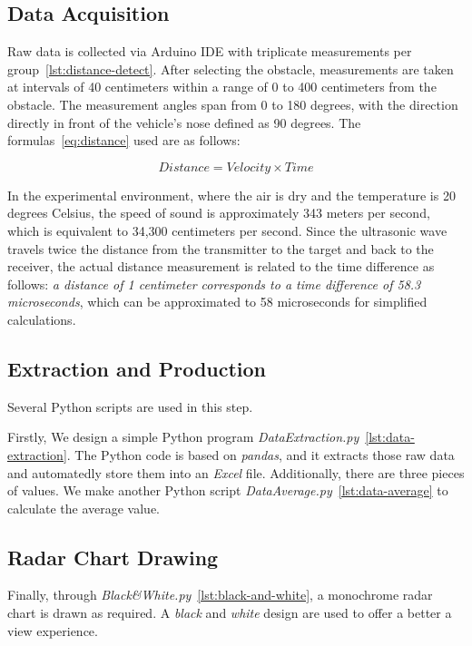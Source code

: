 \subsection{Data Acquisition}
Raw data is collected via Arduino IDE with triplicate measurements per group~\eqref{lst:distance-detect}.
After selecting the obstacle, measurements are taken at intervals of 40 centimeters
within a range of 0 to 400 centimeters from the obstacle.
The measurement angles span from 0 to 180 degrees,
with the direction directly in front of the vehicle's nose defined as 90 degrees.
The formulas~\eqref{eq:distance} used are as follows:

\begin{equation}
  Distance = Velocity \times Time
  \label{eq:distance}
\end{equation}

In the experimental environment, where the air is dry and the temperature is 20 degrees Celsius,
the speed of sound is approximately 343 meters per second, which is equivalent to 34,300 centimeters per second.
Since the ultrasonic wave travels twice the distance from the transmitter to the target and back to the receiver,
the actual distance measurement is related to the time difference as follows:
\textit{a distance of 1 centimeter corresponds to a time difference of 58.3 microseconds}, which
can be approximated to 58 microseconds for simplified calculations.

\subsection{Extraction and Production}
Several Python scripts are used in this step.

Firstly, We design a simple Python program \textit{DataExtraction.py}~\eqref{lst:data-extraction}.
The Python code is based on \textit{pandas}, and
it extracts those raw data and automatedly store them into an \textit{Excel} file.
Additionally, there are three pieces of values.
We make another Python script \textit{DataAverage.py}~\eqref{lst:data-average} to calculate the average value.

\subsection{Radar Chart Drawing}
Finally, through \textit{Black\&White.py}~\eqref{lst:black-and-white},
a monochrome radar chart is drawn as required.
A \textit{black} and \textit{white} design are used to offer a better a view experience.
